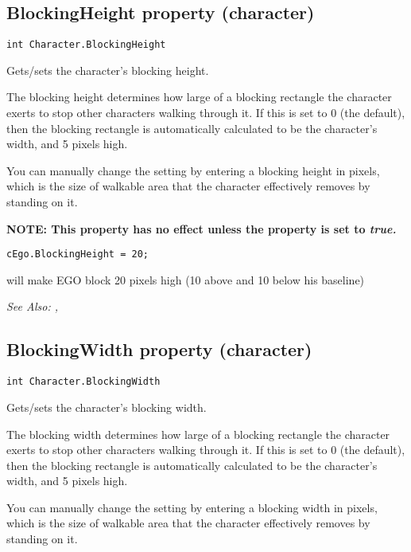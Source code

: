 \subsection{BlockingHeight property (character)}\label{Character.BlockingHeight}%

\begin{verbatim}
int Character.BlockingHeight
\end{verbatim}
Gets/sets the character's blocking height.

The blocking height determines how large of a blocking rectangle the character exerts to
stop other characters walking through it. If this is set to 0 (the default), then the
blocking rectangle is automatically calculated to be the character's width, and 5 pixels
high.

You can manually change the setting by entering a blocking height in pixels, which is the
size of walkable area that the character effectively removes by standing on it.

\bf{NOTE:} This property has no effect unless the  property
is set to \it{true}.

\begin{verbatim}
cEgo.BlockingHeight = 20;
\end{verbatim}
will make EGO block 20 pixels high (10 above and 10 below his baseline)

\it{See Also:} ,


\subsection{BlockingWidth property (character)}\label{Character.BlockingWidth}%

\begin{verbatim}
int Character.BlockingWidth
\end{verbatim}
Gets/sets the character's blocking width.

The blocking width determines how large of a blocking rectangle the character exerts to
stop other characters walking through it. If this is set to 0 (the default), then the
blocking rectangle is automatically calculated to be the character's width, and 5 pixels
high.

You can manually change the setting by entering a blocking width in pixels, which is the
size of walkable area that the character effectively removes by standing on it.

